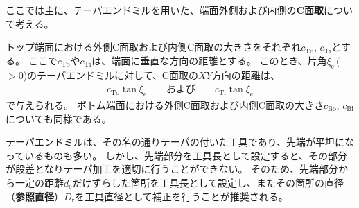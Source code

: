 

ここでは主に、テーパエンドミルを用いた、端面外側および内側の\textbf{C面取}について考える。



トップ端面における外側C面取および内側C面取の大きさをそれぞれ$c_\mathrm{To}$, $c_\mathrm{Ti}$とする。
ここで$c_\mathrm{To}$や$c_\mathrm{Ti}$は、端面に垂直な方向の距離とする。
このとき、片角$\xi_\mathrm e$\,($>0$)のテーパエンドミルに対して、C面取の$XY$方向の距離は、
\begin{align*}
  c_\mathrm{To}\tan\xi_\mathrm e\qquad\text{および}\qquad c_\mathrm{Ti}\tan\xi_\mathrm e
\end{align*}
で与えられる。
ボトム端面における外側C面取および内側C面取の大きさ$c_\mathrm{Bo}$, $c_\mathrm{Bi}$についても同様である。



テーパエンドミルは、その名の通りテーパの付いた工具であり、先端が平坦になっているものも多い。
しかし、先端部分を工具長として設定すると、その部分が段差となりテーパ加工を適切に行うことができない。
そのため、先端部分から一定の距離$d_\mathrm e$だけずらした箇所を工具長として設定し、またその箇所の直径（\textbf{参照直径}）$D_\mathrm r$を工具直径として補正を行うことが推奨される。

